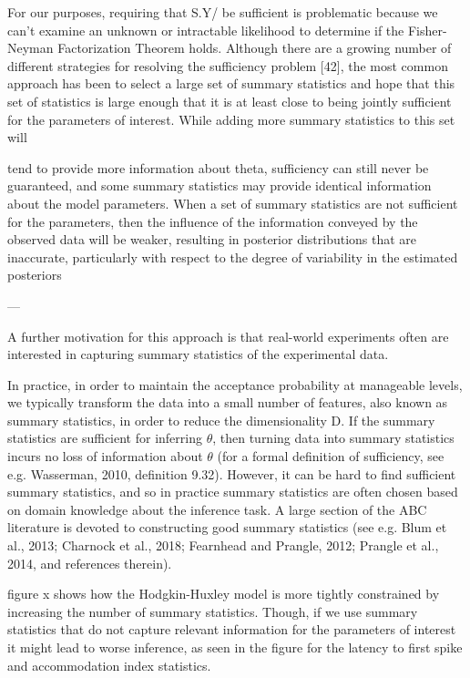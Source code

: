 For our purposes, requiring that S.Y/ be sufficient is problematic because we
can’t examine an unknown or intractable likelihood to determine if the Fisher- Neyman Factorization Theorem holds. Although there are a growing number of different strategies for resolving the sufficiency problem [42], the most common approach has been to select a large set of summary statistics and hope that this set of statistics is large enough that it is at least close to being jointly sufficient for the parameters of interest. While adding more summary statistics to this set will

tend to provide more information about theta, sufficiency can still never be guaranteed, and some summary statistics may provide identical information about the model parameters. When a set of summary statistics are not sufficient for the parameters, then the influence of the information conveyed by the observed data will be weaker, resulting in posterior distributions that are inaccurate, particularly with respect to the degree of variability in the estimated posteriors


---

A further motivation for this approach is that real-world experiments often are interested in capturing summary statistics of the experimental data. 

In practice, in order to maintain the acceptance probability at manageable levels, we typically transform the data into a small number of features, also known as summary statistics, in order to reduce the dimensionality D. If the summary statistics are sufficient for inferring $\theta$, then turning data into summary statistics incurs no loss of information about $\theta$ (for a formal definition of sufficiency, see e.g. Wasserman, 2010, definition 9.32). However, it can be hard to find sufficient summary statistics, and so in practice summary statistics are often chosen based on domain knowledge about the inference task. A large section of the ABC literature is devoted to constructing good summary statistics (see e.g. Blum et al., 2013; Charnock et al., 2018; Fearnhead and Prangle, 2012; Prangle et al., 2014, and references therein).


figure x shows how the Hodgkin-Huxley model is more tightly constrained by increasing the number of summary statistics. Though, if we use summary statistics that do not capture relevant information for the parameters of interest it might lead to worse inference, as seen in the figure for the latency to first spike and accommodation index statistics.  


